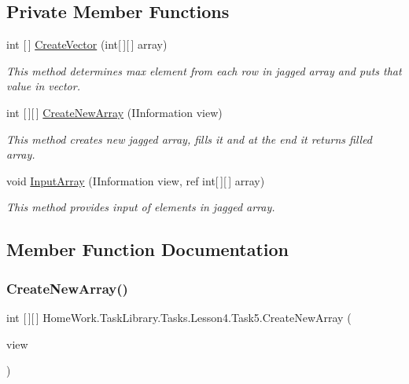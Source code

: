 \subsection*{Private Member Functions}
\begin{DoxyCompactItemize}
\item 
int \mbox{[}$\,$\mbox{]} \mbox{\hyperlink{class_home_work_1_1_task_library_1_1_tasks_1_1_lesson4_1_1_task5_a2133db8f54bc719bf9afeb67144d8ba2}{Create\+Vector}} (int\mbox{[}$\,$\mbox{]}\mbox{[}$\,$\mbox{]} array)
\begin{DoxyCompactList}\small\item\em This method determines max element from each row in jagged array and puts that value in vector. \end{DoxyCompactList}\item 
int \mbox{[}$\,$\mbox{]}\mbox{[}$\,$\mbox{]} \mbox{\hyperlink{class_home_work_1_1_task_library_1_1_tasks_1_1_lesson4_1_1_task5_a1bcc787ef7dfa2359307691d53200318}{Create\+New\+Array}} (I\+Information view)
\begin{DoxyCompactList}\small\item\em This method creates new jagged array, fills it and at the end it returns filled array. \end{DoxyCompactList}\item 
void \mbox{\hyperlink{class_home_work_1_1_task_library_1_1_tasks_1_1_lesson4_1_1_task5_aaed92b4acc1e6396624144c1fc9c3031}{Input\+Array}} (I\+Information view, ref int\mbox{[}$\,$\mbox{]}\mbox{[}$\,$\mbox{]} array)
\begin{DoxyCompactList}\small\item\em This method provides input of elements in jagged array. \end{DoxyCompactList}\end{DoxyCompactItemize}


\subsection{Member Function Documentation}
\mbox{\label{class_home_work_1_1_task_library_1_1_tasks_1_1_lesson4_1_1_task5_a1bcc787ef7dfa2359307691d53200318}} 
\subsubsection{\texorpdfstring{CreateNewArray()}{CreateNewArray()}}
{\footnotesize\ttfamily int \mbox{[}$\,$\mbox{]}\mbox{[}$\,$\mbox{]} Home\+Work.\+Task\+Library.\+Tasks.\+Lesson4.\+Task5.\+Create\+New\+Array (\begin{DoxyParamCaption}\item[{I\+Information}]{view }\end{DoxyParamCaption})\hspace{0.3cm}{\ttfamily [private]}}



